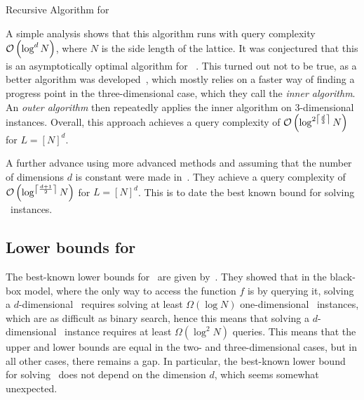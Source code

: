 \begin{algorithm}
	\caption{Recursive Algorithm for \Tarski}\label{alg:recursive_tarski_solver}
\end{algorithm}

A simple analysis shows that this algorithm runs with query complexity $\mathcal{O}\left(\log^{d}{N}\right)$, where $N$ is the side length of the lattice. It was conjectured that this is an asymptotically optimal algorithm for \Tarski~. This turned out not to be true, as a better algorithm was developed~, which mostly relies on a faster way of finding a progress point in the three-dimensional case, which they call the \emph{inner algorithm}. An \emph{outer algorithm} then repeatedly applies the inner algorithm on 3-dimensional instances. Overall, this approach achieves a query complexity of $\mathcal{O}\left(\log^{2\left\lceil\frac{d}{3}\right\rceil}{N}\right)$ for $L = {[N]}^d$.

A further advance using more advanced methods and assuming that the number of dimensions $d$ is constant were made in~. They achieve a query complexity of $\mathcal{O}\left(\log^{\left\lceil\frac{d+1}{2}\right\rceil}{N}\right)$ for $L = {[N]}^d$. This is to date the best known bound for solving \Tarski\ instances.

\subsection{Lower bounds for \Tarski}

The best-known lower bounds for \Tarski\ are given by~. They showed that in the black-box model, where the only way to access the function $f$ is by querying it, solving a $d$-dimensional \Tarski\ requires solving at least $\Omega(\log{N})$ one-dimensional \Tarski\ instances, which are as difficult as binary search, hence this means that solving a $d$-dimensional \Tarski\ instance requires at least $\Omega(\log^{2}{N})$ queries. This means that the upper and lower bounds are equal in the two- and three-dimensional cases, but in all other cases, there remains a gap. In particular, the best-known lower bound for solving \Tarski\ does not depend on the dimension $d$, which seems somewhat unexpected.

